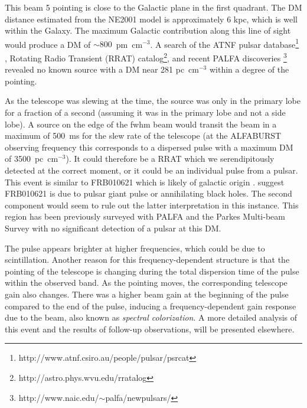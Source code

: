 \documentclass[a4paper,fleqn,usenatbib]{mnras}
\begin{document}
This beam 5 pointing is close to the Galactic plane in the first quadrant. The
DM distance estimated from the NE2001 model \citep{2002astro.ph..7156C} is
approximately 6 kpc, which is well within the Galaxy. The maximum Galactic
contribution along this line of sight would produce a DM of
$\sim800$~pm~cm$^{-3}$. A search of the ATNF pulsar
database\footnote{http://www.atnf.csiro.au/people/pulsar/psrcat}
\citep{2005AJ....129.1993M}, Rotating Radio Transient (RRAT)
catalog\footnote{http://astro.phys.wvu.edu/rratalog}, and recent PALFA
discoveries \footnote{http://www.naic.edu/$\sim$palfa/newpulsars/} revealed no
known source with a DM near 281 pc~cm$^{-3}$ within a degree of the pointing.

As the telescope was slewing at the time, the source was only in the primary
lobe for a fraction of a second (assuming it was in the primary lobe and not a
side lobe). A source on the edge of the \gls{fwhm} beam would transit the beam
in a maximum of 500~ms for the slew rate of the telescope (at the ALFABURST
observing frequency this corresponds to a dispersed pulse with a maximum DM of
3500~pc~cm$^{-3}$).  It could therefore be a RRAT which we serendipitously
detected at the correct moment, or it could be an individual pulse from a
pulsar. This event is similar to FRB010621 \citep{2011MNRAS.415.3065K}
which is likely of galactic origin \citep{2014MNRAS.440..353B}.
\cite{2012MNRAS.425L..71K} suggest FRB010621 is due to pulsar giant pulse or
annihilating black holes. The second component would seem to rule out the latter
interpretation in this instance. This region has been previously surveyed with
PALFA and the Parkes Multi-beam Survey \citep{2001MNRAS.328...17M} with no
significant detection of a pulsar at this DM.

The pulse appears brighter at higher frequencies, which could be due to
scintillation. Another reason for this frequency-dependent structure is that the
pointing of the telescope is changing during the total dispersion time of the
pulse within the observed band. As the pointing moves, the corresponding
telescope gain also changes.  There was a higher beam gain at the beginning of
the pulse compared to the end of the pulse, inducing a frequency-dependent gain
response due to the beam, also known as \emph{spectral colorization}.  A more
detailed analysis of this event and the results of follow-up observations, will
be presented elsewhere.


\end{document}
